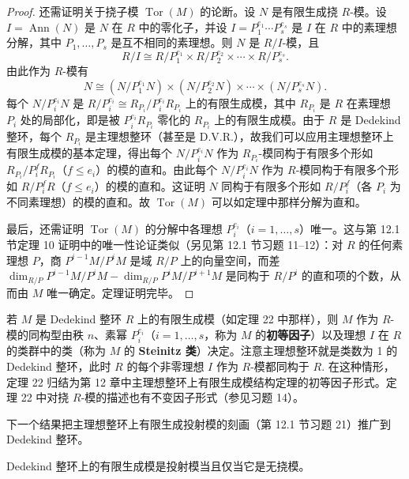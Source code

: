 \begin{proof}
还需证明关于挠子模 \(\operatorname{Tor}(M)\) 的论断。设 \(N\) 是有限生成挠 \(R\)-模。设 \(I = \operatorname{Ann}(N)\) 是 \(N\) 在 \(R\) 中的零化子，并设 \(I = P_1^{e_1}\cdots P_s^{e_s}\) 是 \(I\) 在 \(R\) 中的素理想分解，其中 \(P_1, \ldots, P_s\) 是互不相同的素理想。则 \(N\) 是 \(R/I\)-模，且
\[
R/I \cong R/P_1^{e_1} \times R/P_2^{e_2} \times \cdots \times R/P_s^{e_s}.
\]
由此作为 \(R\)-模有
\[
N \cong (N/P_1^{e_1}N) \times (N/P_2^{e_2}N) \times \cdots \times (N/P_s^{e_s}N).
\]
每个 \(N/P_i^{e_i}N\) 是 \(R/P_i^{e_i} \cong R_{P_i}/P_i^{e_i}R_{P_i}\) 上的有限生成模，其中 \(R_{P_i}\) 是 \(R\) 在素理想 \(P_i\) 处的局部化，即是被 \(P_i^{e_i}R_{P_i}\) 零化的 \(R_{P_i}\) 上的有限生成模。由于 \(R\) 是 Dedekind 整环，每个 \(R_{P_i}\) 是主理想整环（甚至是 D.V.R.），故我们可以应用主理想整环上有限生成模的基本定理，得出每个 \(N/P_i^{e_i}N\) 作为 \(R_{P_i}\)-模同构于有限多个形如 \(R_{P_i}/P_i^fR_{P_i}\)（\(f \leq e_i\)）的模的直和。由此每个 \(N/P_i^{e_i}N\) 作为 \(R\)-模同构于有限多个形如 \(R/P_i^fR\)（\(f \leq e_i\)）的模的直和。这证明 \(N\) 同构于有限多个形如 \(R/P_i^f\)（各 \(P_i\) 为不同素理想）的模的直和。故 \(\operatorname{Tor}(M)\) 可以如定理中那样分解为直和。

最后，还需证明 \(\operatorname{Tor}(M)\) 的分解中各理想 \(P_i^{e_i}\)（\(i = 1, \ldots, s\)）唯一。这与第 12.1 节定理 10 证明中的唯一性论证类似（另见第 12.1 节习题 11--12）：对 \(R\) 的任何素理想 \(P\)，商 \(P^{i-1}M/P^iM\) 是域 \(R/P\) 上的向量空间，而差 \(\dim_{R/P}P^{i-1}M/P^iM-\dim_{R/P}P^iM/P^{i+1}M\) 是同构于 \(R/P^i\) 的直和项的个数，从而由 \(M\) 唯一确定。定理证明完毕。
\end{proof}

若 \(M\) 是 Dedekind 整环 \(R\) 上的有限生成模（如定理 22 中那样），则 \(M\) 作为 \(R\)-模的同构型由秩 \(n\)、素幂 \(P_i^{e_i}\)（\(i = 1, \ldots, s\)，称为 \(M\) 的\textbf{初等因子}）以及理想 \(I\) 在 \(R\) 的类群中的类（称为 \(M\) 的 \textbf{Steinitz 类}）决定。注意主理想整环就是类数为 1 的 Dedekind 整环，此时 \(R\) 的每个非零理想 \(I\) 作为 \(R\)-模都同构于 \(R\). 在这种情形，定理 22 归结为第 12 章中主理想整环上有限生成模结构定理的初等因子形式。定理 22 中对挠 \(R\)-模的描述也有不变因子形式（参见习题 14）。

下一个结果把主理想整环上有限生成投射模的刻画（第 12.1 节习题 21）推广到 Dedekind 整环。

\begin{corollary}\label{cor:16.23}
Dedekind 整环上的有限生成模是投射模当且仅当它是无挠模。
\end{corollary}

